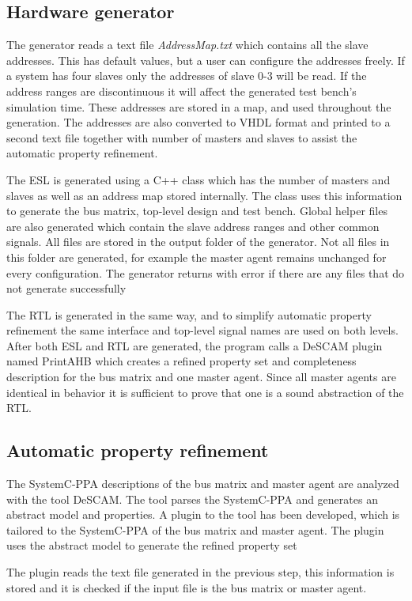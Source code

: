 \subsection{Hardware generator}
The generator reads a text file \textit{AddressMap.txt} which contains all the slave addresses. This has default values, but a user can configure the addresses freely. If a system has four slaves only the addresses of slave 0-3 will be read. If the address ranges are discontinuous it will affect the generated test bench's simulation time. These addresses are stored in a map, and used throughout the generation. The addresses are also converted to VHDL format and printed to a second text file together with number of masters and slaves to assist the automatic property refinement. \par
The ESL is generated using a C++ class which has the number of masters and slaves as well as an address map stored internally. The class uses this information to generate the bus matrix, top-level design and test bench. Global helper files are also generated which contain the slave address ranges and other common signals. All files are stored in the output folder of the generator. Not all files in this folder are generated, for example the master agent remains unchanged for every configuration. The generator returns with error if there are any files that do not generate successfully \par
The RTL is generated in the same way, and to simplify automatic property refinement the same interface and top-level signal names are used on both levels.
After both ESL and RTL are generated, the program calls a DeSCAM plugin named PrintAHB which creates a refined property set and completeness description for the
bus matrix and one master agent. Since all master agents are identical in behavior it is sufficient to prove that one is a sound abstraction of the RTL. 
   
\subsection{Automatic property refinement}
The SystemC-PPA descriptions of the bus matrix and master agent are analyzed with the tool DeSCAM. The tool parses the SystemC-PPA and generates an abstract
model and properties. A plugin to the tool has been developed, which is tailored to the SystemC-PPA of the bus matrix and master agent. The plugin uses the abstract model to generate the refined property set \par
The plugin reads the text file generated in the previous step, this information is stored and it is checked if the input file is the bus matrix or master agent. 

